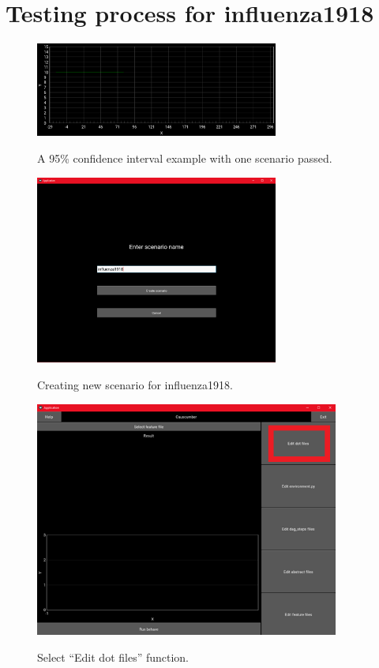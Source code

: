 \chapter{Testing process for influenza1918}
\begin{figure}[H]
	\centering
	\includegraphics[width=8cm]{figures/95confidence_interval.png}\\
	\caption{A 95\% confidence interval example with one scenario passed.}
	\label{fig:figure40}
\end{figure}
\begin{figure}[H]
	\centering
	\includegraphics[width=8cm]{figures/influenzaTestProcess1.png}\\
	\caption{Creating new scenario for influenza1918.}
	\label{fig:figure19}
\end{figure}
\begin{figure}[H]
	\centering
	\includegraphics[width=10cm]{figures/influenzaTestProcess2.png}\\
	\caption{Select “Edit dot files” function.}
	\label{fig:figure20}
\end{figure}
